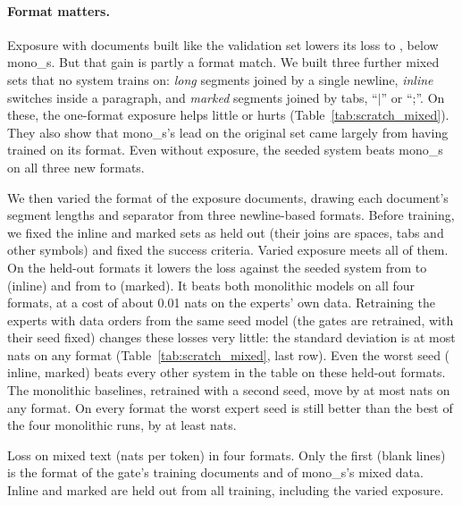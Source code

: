 \documentclass[10pt]{article}
\newcommand{\pending}[1]{{\color{red}\textbf{[#1]}}}
\begin{document}
\paragraph{Format matters.} Exposure with documents built like the validation set lowers its loss
to \resTrackCMixedMixedOneFormat, below mono\_s. But that gain is partly a format match. We
built three further mixed sets that no system trains on: \emph{long} segments joined by a
single newline, \emph{inline} switches inside a paragraph, and \emph{marked} segments joined by
tabs, ``$|$'' or ``;''. On these, the one-format exposure helps little or hurts
(Table~\ref{tab:scratch_mixed}). They also show that mono\_s's lead on the original set came
largely from having trained on its format. Even without exposure, the seeded system beats
mono\_s on all three new formats.

We then varied the format of the exposure documents, drawing each document's segment lengths and
separator from three newline-based formats. Before training, we fixed the inline and marked sets
as held out (their joins are spaces, tabs and other symbols) and fixed the success criteria.
Varied exposure meets all of them. On the held-out formats it lowers the loss against the
seeded system from \resTrackCMixedInlineSeeded{} to \resTrackCMixedInlineVaried{} (inline) and
from \resTrackCMixedMarkedSeeded{} to \resTrackCMixedMarkedVaried{} (marked). It beats both
monolithic models on all four formats, at a cost of about 0.01 nats on the experts' own data.
Retraining the experts with \resTrackCExpertSeeds{} data orders from the same seed model (the
gates are retrained, with their seed fixed) changes these losses very little: the standard
deviation is at most \resTrackCMixedMarkedVariedSd{} nats on any format
(Table~\ref{tab:scratch_mixed}, last row). Even the worst seed (\resTrackCMixedInlineVariedMax{}
inline, \resTrackCMixedMarkedVariedMax{} marked) beats every other system in the table on these
held-out formats. The monolithic baselines, retrained with a second seed, move by at most
\resTrackCMonoSeedGapMax{} nats on any format. On every format the worst expert seed is still
better than the best of the four monolithic runs, by at least \resTrackCMixedWorstMarginMin{}
nats.
\begin{table}[t]
\centering\small
\caption{Loss on mixed text (nats per token) in four formats. Only the first (blank lines) is
the format of the gate's training documents and of mono\_s's mixed data. Inline and marked are
held out from all training, including the varied exposure.}
\label{tab:scratch_mixed}
\IfFileExists{tables/track_c_mixed.tex}{}{\pending{table}}
\end{table}
\end{document}
